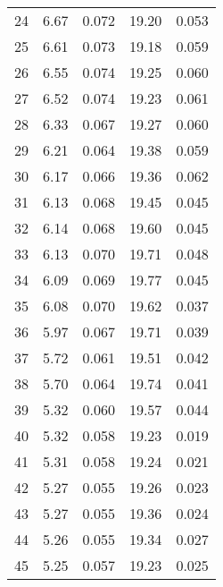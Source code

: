\begin{table}
\begin{tabular}{c|ll|ll}
24 & 6.67 & 0.072 & 19.20 & 0.053 \\
25 & 6.61 & 0.073 & 19.18 & 0.059 \\
26 & 6.55 & 0.074 & 19.25 & 0.060 \\
27 & 6.52 & 0.074 & 19.23 & 0.061 \\
28 & 6.33 & 0.067 & 19.27 & 0.060 \\
29 & 6.21 & 0.064 & 19.38 & 0.059 \\
30 & 6.17 & 0.066 & 19.36 & 0.062 \\
31 & 6.13 & 0.068 & 19.45 & 0.045 \\
32 & 6.14 & 0.068 & 19.60 & 0.045 \\
33 & 6.13 & 0.070 & 19.71 & 0.048 \\
34 & 6.09 & 0.069 & 19.77 & 0.045 \\
35 & 6.08 & 0.070 & 19.62 & 0.037 \\
36 & 5.97 & 0.067 & 19.71 & 0.039 \\
37 & 5.72 & 0.061 & 19.51 & 0.042 \\
38 & 5.70 & 0.064 & 19.74 & 0.041 \\
39 & 5.32 & 0.060 & 19.57 & 0.044 \\
40 & 5.32 & 0.058 & 19.23 & 0.019 \\
41 & 5.31 & 0.058 & 19.24 & 0.021 \\
42 & 5.27 & 0.055 & 19.26 & 0.023 \\
43 & 5.27 & 0.055 & 19.36 & 0.024 \\
44 & 5.26 & 0.055 & 19.34 & 0.027 \\
45 & 5.25 & 0.057 & 19.23 & 0.025 \\
               \hline
        \end{tabular}
    \end{table}
    \clearpage

